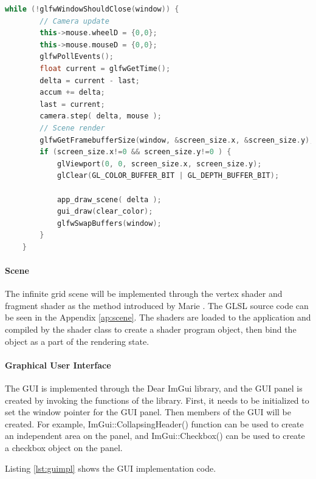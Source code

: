 \clearpage

\begin{lstlisting}[language=C++, label={lst:glfwrun}, caption = Rendering loop implementation]
    while (!glfwWindowShouldClose(window)) {
        // Camera update
        this->mouse.wheelD = {0,0};
        this->mouse.mouseD = {0,0};
        glfwPollEvents();
        float current = glfwGetTime();
        delta = current - last;
        accum += delta;
        last = current; 
        camera.step( delta, mouse );
        // Scene render
        glfwGetFramebufferSize(window, &screen_size.x, &screen_size.y);
        if (screen_size.x!=0 && screen_size.y!=0 ) {
            glViewport(0, 0, screen_size.x, screen_size.y);
            glClear(GL_COLOR_BUFFER_BIT | GL_DEPTH_BUFFER_BIT);

            app_draw_scene( delta );
            gui_draw(clear_color);
            glfwSwapBuffers(window);
        }
    }
\end{lstlisting}

\paragraph{Scene}

The infinite grid scene will be implemented through the vertex shader and fragment shader as the method introduced by Marie \cite{scene}. The GLSL source code can be seen in the Appendix \ref{ap:scene}. The shaders are loaded to the application and compiled by the shader class to create a shader program object, then bind the object as a part of the rendering state.

\paragraph{Graphical User Interface}

The GUI is implemented through the Dear ImGui library, and the GUI panel is created by invoking the functions of the library. First, it needs to be initialized to set the window pointer for the GUI panel. Then members of the GUI will be created. For example, ImGui::CollapsingHeader() function can be used to create an independent area on the panel, and ImGui::Checkbox() can be used to create a checkbox object on the panel.

\hspace*{\fill}

Listing \ref{lst:guimpl} shows the GUI implementation code.

